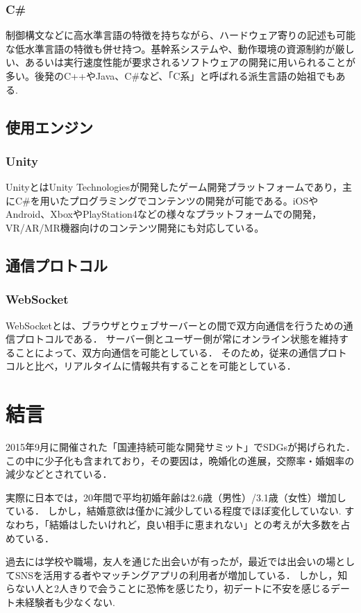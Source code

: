\documentclass[12pt,a4j,titlepage]{ltjsarticle}
\begin{document}
\subsubsection{C\#}
制御構文などに高水準言語の特徴を持ちながら、ハードウェア寄りの記述も可能な低水準言語の特徴も併せ持つ。基幹系システムや、動作環境の資源制約が厳しい、あるいは実行速度性能が要求されるソフトウェアの開発に用いられることが多い。後発のC++やJava、C\#など、「C系」と呼ばれる派生言語の始祖でもある.

\subsection{使用エンジン} 
\subsubsection{Unity}
UnityとはUnity Technologiesが開発したゲーム開発プラットフォームであり，主にC\#を用いたプログラミングでコンテンツの開発が可能である。iOSやAndroid、XboxやPlayStation4などの様々なプラットフォームでの開発，VR/AR/MR機器向けのコンテンツ開発にも対応している。

\subsection{通信プロトコル}
\subsubsection{WebSocket}
WebSocketとは、ブラウザとウェブサーバーとの間で双方向通信を行うための通信プロトコルである．
サーバー側とユーザー側が常にオンライン状態を維持することによって、双方向通信を可能としている．
そのため，従来の通信プロトコルと比べ，リアルタイムに情報共有することを可能としている．
\clearpage

\section{結言}
2015年9月に開催された「国連持続可能な開発サミット」でSDGsが掲げられた．この中に少子化も含まれており，その要因は，晩婚化の進展\cite{sasaki2012}，交際率・婚姻率の減少\cite{naikakufu2019}などとされている．

実際に日本では，20年間で平均初婚年齢は2.6歳（男性）/3.1歳（女性）増加している．
しかし，結婚意欲は僅かに減少している程度でほぼ変化していない.
すなわち，「結婚はしたいけれど，良い相手に恵まれない」との考えが大多数を占めている\cite{naikakufu2019}．

過去には学校や職場，友人を通じた出会いが有ったが，最近では出会いの場としてSNSを活用する者やマッチングアプリの利用者が増加している．
しかし，知らない人と2人きりで会うことに恐怖を感じたり，初デートに不安を感じるデート未経験者も少なくない\cite{prtimes,yoshimura2020}.
\end{document}
